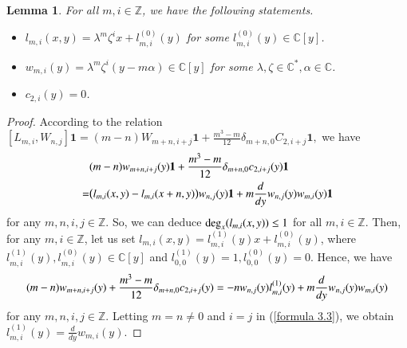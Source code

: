 \documentclass[12pt,reqno]{amsart}
\def\Z{\mathbb{Z}}
\def\C{\mathbb{C}}
\numberwithin{equation}{section}
\newtheorem{lemm}[theo]{Lemma}
\begin{document}
\begin{lemm}\label{le4.4}
For all $m,i\in\mathbb{Z}$, we have the following statements.
\begin{itemize}
\item[{\rm (1)}] 
$l_{m,i}(x,y)=\lambda^m\zeta^ix + l_{m,i}^{(0)}(y)$  for some $l_{m,i}^{(0)}(y)\in \mathbb{C}[y]$.
\item[{\rm (2)}] $w_{m,i}(y)=\lambda^m\zeta^i(y-m\alpha)\in\C[y]$ for some $\lambda,\zeta\in \C^*, \alpha\in\C$.
\item[{\rm (3)}] $c_{2,i}(y)=0$.

\end{itemize}
\end{lemm}
\begin{proof}
    According to the relation  $[L_{m,i},W_{n,j}]\mathbf{1}=(m-n)W_{m+n,i+j}\mathbf{1}+\frac{m^3-m}{12}\delta_{m+n,0}C_{2,i+j}\mathbf{1},$
 we have
\begin{equation}\label{formula 3.2}
\aligned
&(m-n)w_{m+n,i+j}(y)\mathbf{1}+\frac{m^3-m}{12}\delta_{m+n,0}c_{2,i+j}(y)\mathbf{1}\\
=&\big(l_{m,i}(x,y)-l_{m,i}(x+n,y)\big)w_{n,j}(y)\mathbf{1}+m\frac{d}{d{y}}w_{n,j}(y)w_{m,i}(y)\mathbf{1}
\endaligned
\end{equation}
for any $m,n,i,j\in\Z$. So, we can deduce ${\rm deg}_x(l_{m,i}(x,y))\leq1$ for all $m,i\in\Z$. Then, for any $m,i\in\Z$, let us set $l_{m,i}(x,y)=l_{m,i}^{(1)}(y)x+l_{m,i}^{(0)}(y)$, where $l_{m,i}^{(1)}(y),l_{m,i}^{(0)}(y)\in\C[y]$ and $l_{0,0}^{(1)}(y)=1,l_{0,0}^{(0)}(y)=0$. Hence, we have
\begin{equation}\label{formula 3.3}
\aligned
 (m-n)w_{m+n,i+j}(y)+\frac{m^3-m}{12}\delta_{m+n,0}c_{2,i+j}(y)
=-nw_{n,j}(y)l_{m,i}^{(1)}(y)+m\frac{d}{d{y}}{w_{n,j}(y)}w_{m,i}(y)
\endaligned
\end{equation}
for any $m,n,i,j\in\Z$. Letting $m=n\neq 0$ and $i=j$ in (\ref{formula 3.3}), we obtain $l_{m,i}^{(1)}(y)=\frac{d}{dy}{w_{m,i}(y)}$. 


\end{proof}
\end{document}
